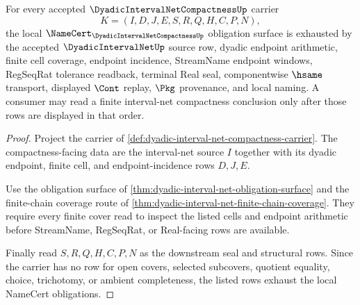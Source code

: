 \begin{theorem}
\label{thm:dyadic-interval-net-compactness-obligations}
For every accepted $\DyadicIntervalNetCompactnessUp$ carrier
$$
K=(I,D,J,E,S,R,Q,H,C,P,N),
$$
the local $\NameCert_{\DyadicIntervalNetCompactnessUp}$ obligation surface is exhausted by the accepted $\DyadicIntervalNetUp$ source row, dyadic endpoint arithmetic, finite cell coverage, endpoint incidence, StreamName endpoint windows, RegSeqRat tolerance readback, terminal Real seal, componentwise $\hsame$ transport, displayed $\Cont$ replay, $\Pkg$ provenance, and local naming. A consumer may read a finite interval-net compactness conclusion only after those rows are displayed in that order.
\end{theorem}
\begin{proof}
Project the carrier of \autoref{def:dyadic-interval-net-compactness-carrier}. The compactness-facing data are the interval-net source $I$ together with its dyadic endpoint, finite cell, and endpoint-incidence rows $D,J,E$.

Use the obligation surface of \autoref{thm:dyadic-interval-net-obligation-surface} and the finite-chain coverage route of \autoref{thm:dyadic-interval-net-finite-chain-coverage}. They require every finite cover read to inspect the listed cells and endpoint arithmetic before StreamName, RegSeqRat, or Real-facing rows are available.

Finally read $S,R,Q,H,C,P,N$ as the downstream seal and structural rows. Since the carrier has no row for open covers, selected subcovers, quotient equality, choice, trichotomy, or ambient completeness, the listed rows exhaust the local NameCert obligations.
\end{proof}

